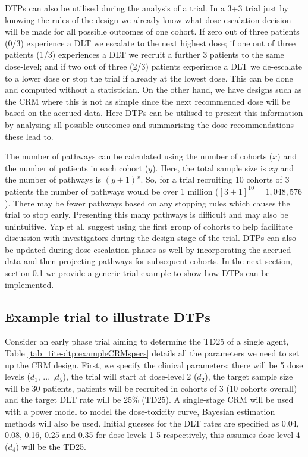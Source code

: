 DTPs can also be utilised during the analysis of a trial. In a 3+3 trial just by knowing the rules of the design we already know what dose-escalation decision will be made for all possible outcomes of one cohort. If zero out of three patients (0/3) experience a DLT we escalate to the next highest dose; if one out of three patients (1/3) experiences a DLT we recruit a further 3 patients to the same dose-level; and if two out of three (2/3) patients experience a DLT we de-escalate to a lower dose or stop the trial if already at the lowest dose. This can be done and computed without a statistician. On the other hand, we have designs such as the CRM where this is not as simple since the next recommended dose will be based on the accrued data. Here DTPs can be utilised to present this information by analysing all possible outcomes and summarising the dose recommendations these lead to.

The number of pathways can be calculated using the number of cohorts ($x$) and the number of patients in each cohort ($y$). Here, the total sample size is $xy$ and the number of pathways is $(y+1)^x$. So, for a trial recruiting 10 cohorts of 3 patients the number of pathways would be over 1 million ($[3+1]^{10} = 1,048,576$). There may be fewer pathways based on any stopping rules which causes the trial to stop early. Presenting this many pathways is difficult and may also be unintuitive. Yap et al. \cite{yapDoseTransitionPathways2017} suggest using the first group of cohorts to help facilitate discussion with investigators during the design stage of the trial. DTPs can also be updated during dose-escalation phases as well by incorporating the accrued data and then projecting pathways for subsequent cohorts. In the next section, section \ref{tite-dtp:Example-DTPs} we provide a generic trial example to show how DTPs can be implemented.  

\subsection{Example trial to illustrate DTPs}
\label{tite-dtp:Example-DTPs}

Consider an early phase trial aiming to determine the TD25 of a single agent, Table \ref{tab_tite-dtp:exampleCRMspecs} details all the parameters we need to set up the CRM design. First, we specify the clinical parameters; there will be 5 dose levels ($d_1$, ... ,$d_5$), the trial will start at dose-level 2 ($d_2$), the target sample size will be 30 patients, patients will be recruited in cohorts of 3 (10 cohorts overall) and the target DLT rate will be 25\% (TD25). A single-stage CRM will be used with a power model to model the dose-toxicity curve, Bayesian estimation methods will also be used. Initial guesses for the DLT rates are specified as 0.04, 0.08, 0.16, 0.25 and 0.35 for dose-levels 1-5 respectively, this assumes dose-level 4 ($d_4$) will be the TD25. 

